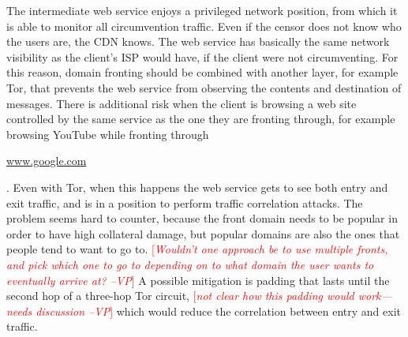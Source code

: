 \documentclass{sig-alternate}
\newcommand{\meek}{meek\xspace}
\def\urll#1{\begin{NoHyper}\url{#1}\end{NoHyper}}
\newcommand{\note}[1]{{\textcolor{red}{[\textit{#1}]}}}
\newcommand{\vp}[1]{\note{#1 --VP}}
\begin{document}
The intermediate web service enjoys a privileged network position,
from which it is able to monitor all circumvention traffic.
Even if the censor does not know who the users are, the CDN knows.
The web service has basically the same network visibility
as the client's ISP would have, if the client were not circumventing.
For this reason, domain fronting should be combined with another
layer, for example Tor, that prevents the web service from
observing the contents and destination of messages.
There is additional risk when the client is browsing a web site
controlled by the same service as the one they are fronting through,
for example browsing YouTube while fronting through \urll{www.google.com}.
Even with Tor, when this happens the web service gets to see
both entry and exit traffic, and is in a position to
perform traffic correlation attacks.
The problem seems hard to counter, because the front domain needs
to be popular in order to have high collateral damage,
but popular domains are also the ones that people tend to want to go to.
\vp{Wouldn't one approach be to use multiple fronts, and pick which one
to go to depending on to what domain the user wants to eventually arrive at?}
A possible mitigation is padding that lasts until
the second hop of a three-hop Tor circuit,
\vp{not clear how this padding would work---needs discussion}
which would reduce the correlation between entry and exit traffic.

\end{document}
